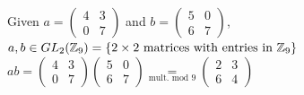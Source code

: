 \begin{example}
Given $a=\left(\begin{matrix}
4 & 3 \\
0 & 7 
\end{matrix}\right)$ and $b=\left(\begin{matrix}
5 & 0 \\
6 & 7 
\end{matrix}\right)$, $a,b\in GL_2({\mathbb{ Z}}_9)=\{2\times 2 \text{ matrices with entries in }{\mathbb{ Z}}_9\}$\\
$ab=\left(\begin{matrix}
4 & 3 \\
0 & 7 
\end{matrix}\right)\left(\begin{matrix}
5 & 0 \\
6 & 7 
\end{matrix}\right)\underset{\text{mult. mod 9}}{=}\left(\begin{matrix}
2 & 3 \\
6 & 4 
\end{matrix}\right)$\steezybreak\\
\end{example}
